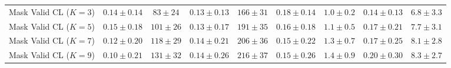 \documentclass{uai2026} %
\newcommand{\1}{\mathbf{1}}
\begin{document}
\begin{table}[ht]
\begin{tabular}{@{}l|cc|cc|cc|cc@{}}
    Mask Valid CL ($K{=}3$)  & $0.14{\pm}0.14$               & $83{\pm}24$  & $0.13{\pm}0.13$ & $166{\pm}31$ & $0.18{\pm}0.14$ & $1.0{\pm}0.2$ & $0.14{\pm}0.13$ & $6.8{\pm}3.3$ \\
    Mask Valid CL ($K{=}5$)  & $0.15{\pm}0.18$               & $101{\pm}26$ & $0.13{\pm}0.17$ & $191{\pm}35$ & $0.16{\pm}0.18$ & $1.1{\pm}0.5$ & $0.17{\pm}0.21$ & $7.7{\pm}3.1$ \\
    Mask Valid CL ($K{=}7$)  & $0.12{\pm}0.20$               & $118{\pm}29$ & $0.14{\pm}0.21$ & $206{\pm}36$ & $0.15{\pm}0.22$ & $1.3{\pm}0.7$ & $0.17{\pm}0.25$ & $8.1{\pm}2.8$ \\
    Mask Valid CL ($K{=}9$)  & $0.10{\pm}0.21$               & $131{\pm}32$ & $0.14{\pm}0.26$ & $216{\pm}37$ & $0.15{\pm}0.26$ & $1.4{\pm}0.9$ & $0.20{\pm}0.30$ & $8.3{\pm}2.7$ \\
    \bottomrule
  \end{tabular}
\end{table}

\end{document}
